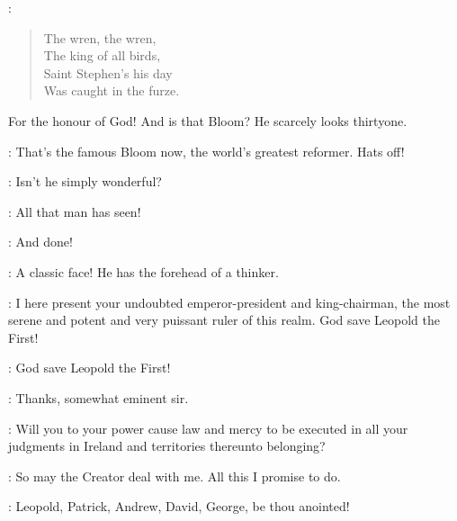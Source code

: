 \BloomsBoys:
\begin{verse}
    The wren, the wren,\\
    The king of all birds,\\
    Saint Stephen's his day\\
    Was caught in the furze.
\end{verse}


\Blacksmith {}
For the honour of God!
And is that Bloom?
He scarcely looks thirtyone.

\Flagger:
That's the famous Bloom now, the world's greatest reformer.
Hats off!


\Millionairess:
Isn't he simply wonderful?

\Noblewoman:
All that man has seen!

\Feminist:
And done!

\Bellhanger:
A classic face!
He has the forehead of a thinker.


\DownConnor:
I here present your undoubted emperor-president and king-chairman,
the most serene and potent and very puissant ruler of this realm.
God save Leopold the First!

\All:
God save Leopold the First!

\Bloom:
Thanks, somewhat eminent sir.

\WillArmagh:
Will you to your power cause law and mercy to be executed
in all your judgments in Ireland and territories thereunto belonging?

\Bloom:
So may the Creator deal with me.
All this I promise to do.

\MikeArmagh:
Leopold, Patrick, Andrew, David, George, be thou anointed!


